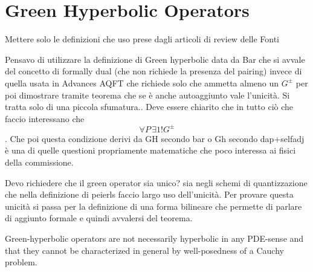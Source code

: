\documentclass[Main]{subfiles}
\begin{document}
			
							
			
		\section{Green Hyperbolic Operators}
			\begin{Warning}
				Mettere solo le definizioni che uso prese dagli articoli di review delle Fonti
		\end{Warning}	
					\begin{Warning}
				Pensavo di utilizzare la definizione di Green hyperbolic data da Bar che si avvale del concetto di formally dual (che non richiede la presenza del pairing) invece di quella usata in Advances AQFT che richiede solo che ammetta almeno un $G^\pm$  per poi dimostrare tramite teorema che se è anche autoaggiunto vale l'unicità. Si tratta solo di una piccola sfumatura.. Deve essere chiarito che in tutto ciò che faccio interessano che $$\forall P \, \exists1!G^\pm$$.
				Che poi questa condizione derivi da GH secondo bar o Gh secondo dap+selfadj è una di quelle questioni propriamente matematiche che poco interessa ai fisici della commissione.
			\end{Warning}			
			
			\begin{Warning}
			Devo richiedere che il green operator sia unico? sia negli schemi di quantizzazione che nella definizione di peierls faccio largo uso dell'unicità. 
			Per provare questa unicità si passa per la definizione di una forma bilineare che permette di parlare di aggiunto formale e quindi avvalersi del teorema.
			\end{Warning}
			
		    Green-hyperbolic operators are not necessarily hyperbolic in any PDE-sense and that they cannot be characterized in general by well-posedness of a Cauchy problem. \cite{Terlaky2010} \cite{Bar2010}
		
		
		
				
				
\end{document}

